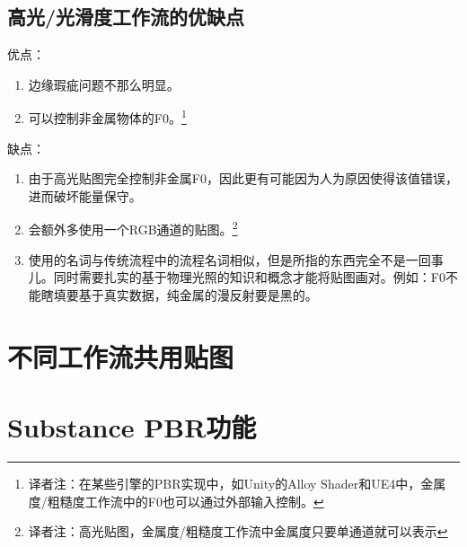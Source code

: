 \subsection{高光/光滑度工作流的优缺点}

优点：

\begin{enumerate}
\item 边缘瑕疵问题不那么明显。
\item 可以控制非金属物体的F0。\footnote{译者注：在某些引擎的PBR实现中，如Unity的Alloy Shader和UE4中，金属度/粗糙度工作流中的F0也可以通过外部输入控制。}
\end{enumerate}

缺点：

\begin{enumerate}
\item 由于高光贴图完全控制非金属F0，因此更有可能因为人为原因使得该值错误，进而破坏能量保守。
\item 会额外多使用一个RGB通道的贴图。\footnote{译者注：高光贴图，金属度/粗糙度工作流中金属度只要单通道就可以表示}
\item 使用的名词与传统流程中的流程名词相似，但是所指的东西完全不是一回事儿。同时需要扎实的基于物理光照的知识和概念才能将贴图画对。例如：F0不能瞎填要基于真实数据，纯金属的漫反射要是黑的。
\end{enumerate}

\section{不同工作流共用贴图}
\label{sec:common_maps}

\section{Substance PBR功能}